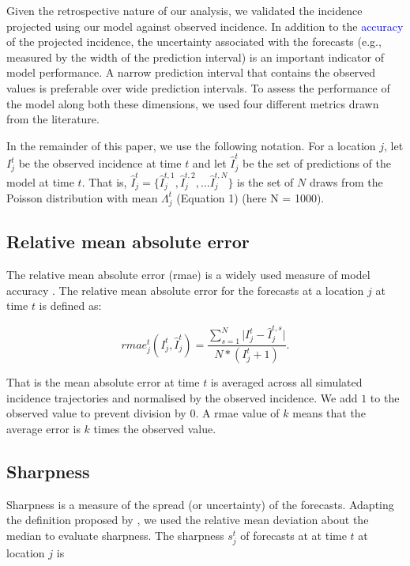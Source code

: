 \documentclass[9pt,twocolumn,twoside,lineno]{pnas-new}
\newcommand{\sangeeta}[1]{\textcolor{blue}{#1}}
\begin{document}
{Given the retrospective nature of our analysis, we validated the
incidence projected using our model against observed incidence. In
addition to the \sangeeta{accuracy} of the projected incidence, the uncertainty
associated with the forecasts (e.g., measured by the width of the
prediction interval) is an important indicator of model performance. A
narrow prediction interval that contains the observed values is
preferable over wide prediction intervals. To assess the performance of
the model along both these dimensions, we used four different metrics
drawn from the literature.

In the remainder of this paper, we use the following notation. For a
location \(j\), let \(I_{j}^{t}\) be the observed incidence at time $t$
and let $\hat{I}_{j}^{t}$ be the set of predictions of the
model at time \(t\). That is, $\hat{I}_{j}^{t}= \{\hat{I}_{j}^{t, 1}, \hat{I}_{j}^{t, 2}, \dots \hat{I}_{j}^{t,N}\}$
is the set of \(N\) draws from the Poisson distribution with mean
\(\Lambda_{j}^{t}\) (Equation 1) (here N = 1000).



\subsection*{Relative mean absolute error}\label{relative-mean-absolute-error}

The relative mean absolute error (rmae) is a widely used measure of
model accuracy \cite{tofallis2015better}. The relative mean absolute
error for the forecasts at a location \(j\) at time \(t\) is defined as:

\begin{equation*}
  rmae_{j}^{t}(I_{j}^{t}, \hat{I}_{j}^{t}) = 
 \frac{
 \sum_{s = 1}^N{\lvert I_{j}^{t} - \hat{I}_{j}^{t, s} \rvert}
 }
 { N *  (I_{j}^{t} + 1)}.
\end{equation*}

That is the mean absolute error at time \(t\) is averaged
across all simulated incidence trajectories and normalised by the
observed incidence. We add \(1\) to the observed value to prevent division
by \(0\). A rmae value of \(k\) means that the average error is \(k\)
times the observed value.

\subsection*{Sharpness}\label{sharpness}

Sharpness is a measure of the spread (or uncertainty) of the forecasts.
Adapting the definition proposed by \cite{funk2017assessing}, we used
the relative mean deviation about the median to evaluate
sharpness. The sharpness $s_{j}^t$ of forecasts at at time \(t\)
at location \(j\) is

}
\end{document}
